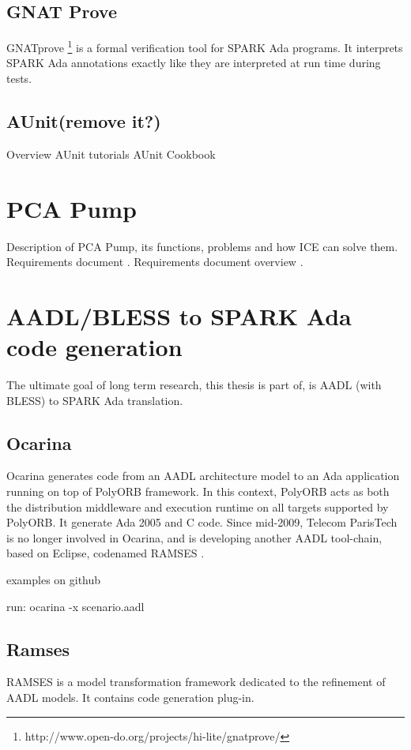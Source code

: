 \subsection{GNAT Prove}
\label{background:spark:gnatprove}
GNATprove \footnote{http://www.open-do.org/projects/hi-lite/gnatprove/} is a formal verification tool for SPARK Ada programs. It interprets SPARK Ada annotations exactly like they are interpreted at run time during tests.


\subsection{AUnit(remove it?)}
\label{background:spark:aunit}
Overview
AUnit tutorials \cite{AUnitTutorials:Online}
AUnit Cookbook \cite{AUnitCookbook:Online}



\section{PCA Pump}
\label{background:pcapump}
Description of PCA Pump, its functions, problems and how ICE can solve them.
Requirements document \cite{PcaReq}.
Requirements document overview \cite{OpenSourcePCAPump:Paper}.


\section{AADL/BLESS to SPARK Ada code generation}
\label{background:codegen}
The ultimate goal of long term research, this thesis is part of, is AADL (with BLESS) to SPARK Ada translation.


\subsection{Ocarina}
\label{background:codegen:ocarina}
Ocarina \cite{Ocarina:Paper,Ocarina:Paper} generates code from an AADL architecture model to an Ada application running on top of PolyORB framework. In this context, PolyORB acts as both the distribution middleware and execution runtime on all targets supported by PolyORB.
It generate Ada 2005 and C code.
Since mid-2009, Telecom ParisTech is no longer involved in Ocarina, and is developing another AADL tool-chain, based on Eclipse, codenamed RAMSES \cite{Ocarina:About:Online}.

examples on github

run:
ocarina -x scenario.aadl




\subsection{Ramses}
\label{background:codegen:ramses}
RAMSES is a model transformation framework dedicated to the refinement of AADL models. It contains code generation plug-in.

